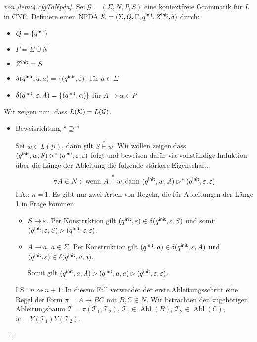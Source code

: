   
\begin{proof}[von \autoref{lem:4.cfgToNpda}]
Sei $\mathcal{G} = (\Sigma,N,P,S)$ eine kontextfreie Grammatik für $L$ in \ac{CNF}.
                Definiere einen \ac{NPDA} $\mathcal{K} = (\Sigma,Q,\Gamma,q^\mathsf{init},Z^\mathsf{init},\delta)$ durch:
                \begin{itemize}
                        \item $Q = \{q^\mathsf{init}\}$ 
                        \item $\Gamma = \Sigma\overset.\cup N$
                        \item $Z^\mathsf{init} = S$
                        \item $\delta(q^\mathsf{init},a,a) = \{(q^\mathsf{init},\varepsilon)\} $ für $ a\in\Sigma$
                        \item $\delta(q^\mathsf{init},\varepsilon,A) = \{(q^\mathsf{init},\alpha)\}$ für $A\to\alpha\in P$
                \end{itemize}
Wir zeigen nun, dass $L(\mathcal{K}) = L(\mathcal{G})$.
\begin{itemize}
 \item Beweisrichtung ``$\supseteq$''
 
 Sei $w\in L(\mathcal{G})$, dann gilt $S\stackrel{*}{\vdash} w$.
 Wir wollen zeigen dass $(q^\mathsf{init}, w, S) \rhd^* (q^\mathsf{init}, \varepsilon, \varepsilon)$ folgt und beweisen dafür via vollständige Induktion über die Länge der Ableitung die folgende stärkere Eigenschaft.
     \begin{displaymath}
      \forall A \in N: \text{ wenn } A \stackrel{*}{\vdash} w, \text{dann } (q^\mathsf{init}, w, A) \rhd^* (q^\mathsf{init}, \varepsilon, \varepsilon)
    \end{displaymath}
  I.A.: $n=1$: Es gibt nur zwei Arten von Regeln, die für Ableitungen der Länge 1 in Frage kommen:
  \begin{itemize}
        \item $S \to \varepsilon$.
        Per Konstruktion gilt $(q^\mathsf{init}, \varepsilon) \in \delta(q^\mathsf{init}, \varepsilon, S)$ und somit $(q^\mathsf{init}, \varepsilon, S) \rhd (q^\mathsf{init}, \varepsilon, \varepsilon)$.
      \item $A \to a$, $a \in \Sigma$.
        Per Konstruktion gilt $(q^\mathsf{init}, a) \in \delta(q^\mathsf{init}, \varepsilon, A)$ und $(q^\mathsf{init}, \varepsilon) \in \delta(q^\mathsf{init}, a, a)$.

        Somit gilt $(q^\mathsf{init}, a, A) \rhd (q^\mathsf{init}, a, a) \rhd (q^\mathsf{init}, \varepsilon, \varepsilon)$.
   \end{itemize}
   
   I.S.: $n\rightsquigarrow n+1$: In diesem Fall verwendet der erste Ableitungsschritt eine Regel der Form $\pi = A \to BC$ mit $B,C \in N$.
   Wir betrachten den zugehörigen Ableitungsbaum $\mathcal{T} = \pi(\mathcal{T}_1, \mathcal{T}_2)$, $\mathcal{T}_1 \in \operatorname{Abl}(B)$, $\mathcal{T}_2 \in \operatorname{Abl}(C)$, $w = Y(\mathcal{T}_1)Y(\mathcal{T}_2)$.


\end{itemize}
\end{proof}
